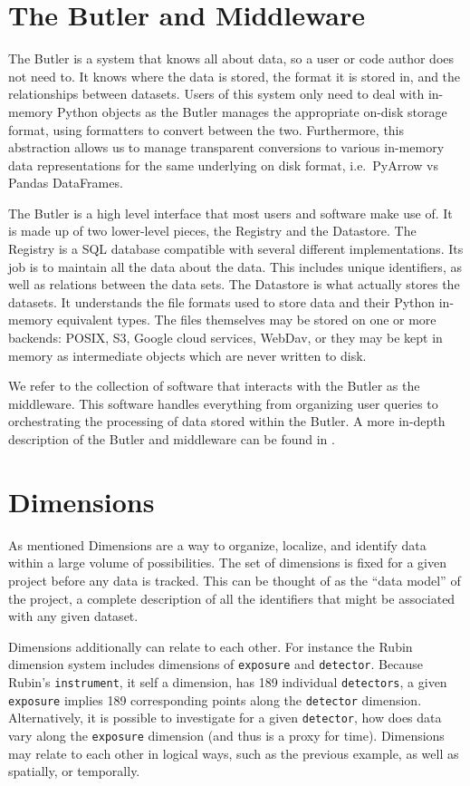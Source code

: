 \documentclass[11pt,twoside]{article}
\begin{document}
\section{The Butler and Middleware}
The Butler is a system that knows all about data, so a user or code author does not need to. It knows where the data is stored, the format it is stored in, and the relationships between datasets. Users of this system only need to deal with in-memory Python objects as the Butler manages the appropriate on-disk storage format, using formatters to convert between the two. Furthermore, this abstraction allows us to manage transparent conversions to various in-memory data representations for the same underlying on disk format, i.e.\ PyArrow vs Pandas DataFrames.

The Butler is a high level interface that most users and software make use of. It is made up of two lower-level pieces, the Registry and the Datastore. The Registry is a SQL database compatible with several different implementations. Its job is to maintain all the data about the data. This includes unique identifiers, as well as relations between the data sets. The Datastore is what actually stores the datasets. It understands the file formats used to store data and their Python in-memory equivalent types. The files themselves may be stored on one or more backends: POSIX, S3, Google cloud services, WebDav, or they may be kept in memory as intermediate objects which are never written to disk.

We refer to the collection of software that interacts with the Butler as the middleware. This software handles everything from organizing user queries to orchestrating the processing of data stored within the Butler. A more in-depth description of the Butler and middleware can be found in \citet{2022SPIE12189E..11J}.

\section{Dimensions}
As mentioned Dimensions are a way to organize, localize, and identify data within a large volume of possibilities. The set of dimensions is fixed for a given project before any data is tracked. This can be thought of as the ``data model'' of the project, a complete description of all the identifiers that might be associated with any given dataset.

Dimensions additionally can relate to each other. For instance the Rubin dimension system includes dimensions of \texttt{exposure} and \texttt{detector}. Because Rubin's \texttt{instrument}, it self a dimension,  has 189 individual \texttt{detectors}, a given \texttt{exposure} implies 189 corresponding points along the \texttt{detector} dimension. Alternatively, it is possible to investigate for a given \texttt{detector}, how does data vary along the \texttt{exposure} dimension (and thus is a proxy for time). Dimensions may relate to each other in logical ways, such as the previous example, as well as spatially, or temporally.
\end{document}
